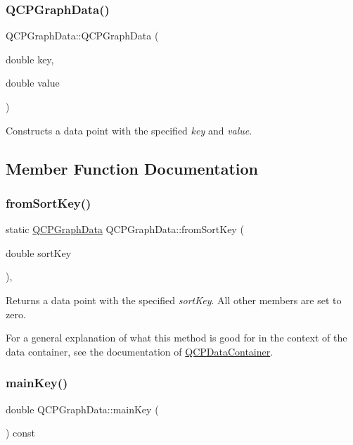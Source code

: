 \subsubsection{\texorpdfstring{Q\+C\+P\+Graph\+Data()}{QCPGraphData()}\hspace{0.1cm}{\footnotesize\ttfamily [2/2]}}
{\footnotesize\ttfamily Q\+C\+P\+Graph\+Data\+::\+Q\+C\+P\+Graph\+Data (\begin{DoxyParamCaption}\item[{double}]{key,  }\item[{double}]{value }\end{DoxyParamCaption})}

Constructs a data point with the specified {\itshape key} and {\itshape value}. 

\subsection{Member Function Documentation}
\mbox{\label{classQCPGraphData_a4646eac7f7a48970ea0fc5153aab0e77}} 
\subsubsection{\texorpdfstring{from\+Sort\+Key()}{fromSortKey()}}
{\footnotesize\ttfamily static \hyperlink{classQCPGraphData}{Q\+C\+P\+Graph\+Data} Q\+C\+P\+Graph\+Data\+::from\+Sort\+Key (\begin{DoxyParamCaption}\item[{double}]{sort\+Key }\end{DoxyParamCaption})\hspace{0.3cm}{\ttfamily [inline]}, {\ttfamily [static]}}

Returns a data point with the specified {\itshape sort\+Key}. All other members are set to zero.

For a general explanation of what this method is good for in the context of the data container, see the documentation of \hyperlink{classQCPDataContainer}{Q\+C\+P\+Data\+Container}. \mbox{\label{classQCPGraphData_a72fdaf738f679ef93bea3d552ba42d1b}} 
\subsubsection{\texorpdfstring{main\+Key()}{mainKey()}}
{\footnotesize\ttfamily double Q\+C\+P\+Graph\+Data\+::main\+Key (\begin{DoxyParamCaption}{ }\end{DoxyParamCaption}) const\hspace{0.3cm}{\ttfamily [inline]}}

